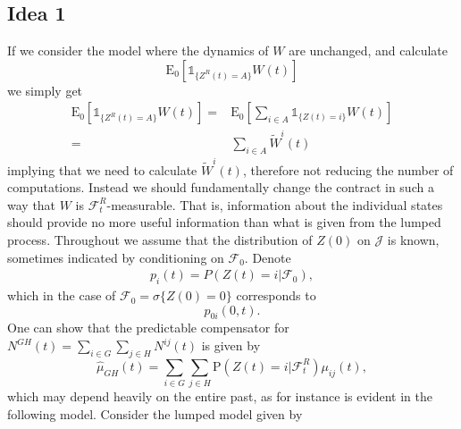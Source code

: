 \documentclass[12pt]{article}
\newcommand{\E}{\text{E}}
\newcommand{\indic}[1]{\mathds{1}_{ \{ #1 \} }}
\renewcommand{\P}{\text{P}}
\theoremstyle{my_thm}
\begin{document}
\subsection*{Idea 1}
If we consider the model where the dynamics of $W$ are unchanged, and calculate
$$
\E_0 [\indic{Z^R(t) = A} W(t)]
$$
we simply get
\begin{align*}
\E_0 [\indic{Z^R(t) = A} W(t)] = & \E_0  \left[ \sum_{i \in A} \indic{Z(t)=i} W(t) \right]
\\
=& \sum_{i \in A} \tilde{W}^i(t)
\end{align*}
implying that we need to calculate $\tilde{W}^i(t)$, therefore not reducing the number of computations. Instead we should fundamentally change the contract in such a way that $W$ is $\mathcal{F}_t^R$-measurable. That is, information about the individual states should provide no more useful information than what is given from the lumped process. Throughout we assume that the distribution of $Z(0)$ on $\mathcal{J}$ is known, sometimes indicated by conditioning on $\mathcal{F}_0$. Denote
\begin{align*}
p_i(t)=P(Z(t)=i|\mathcal{F}_0),
\end{align*}
which in the case of $\mathcal{F}_0=\sigma\{ Z(0) = 0\}$ corresponds to
$$
p_{0i}(0,t).
$$
One can show that the predictable compensator for $N^{GH}(t)=\sum_{i \in G}\sum_{j \in H} N^{ij}(t)$ is given by
$$
\hat{\mu}_{GH}(t)=\sum_{i \in G}\sum_{j \in H} \P(Z(t)=i |\mathcal{F}_t^R) \mu_{ij}(t),
$$
which may depend heavily on the entire past, as for instance is evident in the following model. Consider the lumped model given by
\def\sca{3.5}
\def\scaa{0.9}
\begin{figure}[H]
\begin{center}
\end{center}
\end{figure}
\end{document}
